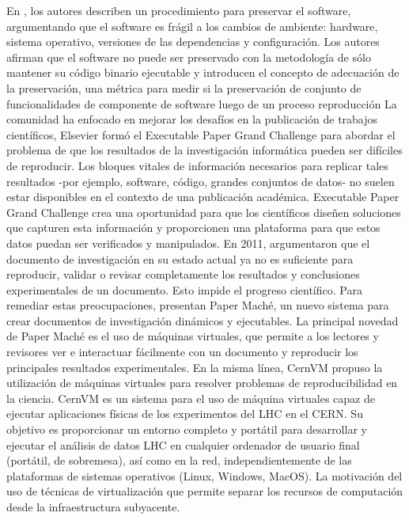 En \cite{DBLP:conf/ipres/MatthewsCWJBS09}, los autores describen un procedimiento para preservar el software, argumentando que el software es frágil a los cambios de ambiente: hardware, sistema operativo, versiones de las dependencias y configuración. Los autores afirman que el software no puede ser preservado con la metodología de sólo mantener su código binario ejecutable y introducen el concepto de adecuación de la preservación, una métrica para medir si la preservación de conjunto de funcionalidades de componente de software luego de un proceso reproducción
La comunidad ha enfocado en mejorar los desafíos en la publicación de trabajos científicos, Elsevier formó el Executable Paper Grand Challenge para abordar el problema de que los resultados de la investigación informática pueden ser difíciles de reproducir. Los bloques vitales de información necesarios para replicar tales resultados -por ejemplo, software, código, grandes conjuntos de datos- no suelen estar disponibles en el contexto de una publicación académica.  Executable Paper Grand Challenge crea una oportunidad para que los científicos diseñen soluciones que capturen esta información y proporcionen una plataforma para que estos datos puedan ser verificados y manipulados. En 2011, \cite{DBLP:journals/procedia/BrammerCMW11} argumentaron que el documento de investigación en su estado actual ya no es suficiente para reproducir, validar o revisar completamente los resultados y conclusiones experimentales de un documento. Esto impide el progreso científico. Para remediar estas preocupaciones, presentan Paper Maché, un nuevo sistema para crear documentos de investigación dinámicos y ejecutables. La principal novedad de Paper Maché es el uso de máquinas virtuales, que permite a los lectores y revisores ver e interactuar fácilmente con un documento y reproducir los principales resultados experimentales.
En la misma línea, CernVM \cite{buncic2010cernvm} propuso la utilización de máquinas virtuales para resolver problemas de reproducibilidad en la ciencia. CernVM es un sistema para el uso de máquina virtuales capaz de ejecutar aplicaciones físicas de los experimentos del LHC en el CERN. Su objetivo es proporcionar un entorno completo y portátil para desarrollar y ejecutar el análisis de datos LHC en cualquier ordenador de usuario final (portátil, de sobremesa), así como en la red, independientemente de las plataformas de sistemas operativos (Linux, Windows, MacOS). La motivación del uso de técnicas de virtualización que permite separar los recursos de computación desde la infraestructura subyacente.

